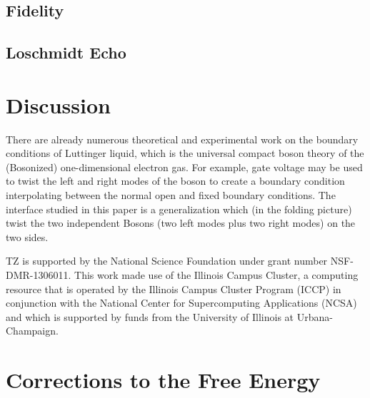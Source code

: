 \documentclass[preprint, prb]{revtex4-1}
\begin{document}
\subsection{Fidelity}
\subsection{Loschmidt Echo}

\section{Discussion}


There are already numerous theoretical and experimental work on the boundary conditions of Luttinger liquid\cite{schmeltzer_zero_1999,anfuso_luttinger_2003,voit_bounded_2000,fabrizio_interacting_1995,egger_applying_1998}, which is the universal compact boson theory of the (Bosonized) one-dimensional electron gas\cite{giamarchi_quantum_2015}. For example, gate voltage \cite{egger_applying_1998} may be used to twist the left and right modes of the boson to create a boundary condition interpolating between the normal open and fixed boundary conditions. The interface studied in this paper is a generalization which (in the folding picture) twist the two independent Bosons (two left modes plus two right modes) on the two sides. 

\begin{acknowledgments}
    TZ is supported by the National Science Foundation under grant number NSF-DMR-1306011.
    This work made use of the Illinois Campus Cluster, a computing resource that is operated by the
    Illinois Campus Cluster Program (ICCP) in conjunction with the National Center for
    Supercomputing Applications (NCSA) and which is supported by funds from the University of
    Illinois at Urbana-Champaign.
\end{acknowledgments}

\appendix
\section{Corrections to the Free Energy}
\label{app:F_correction}

\end{document}
